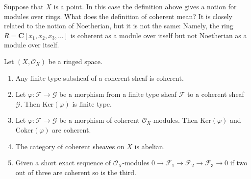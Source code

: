 \begin{example}
\label{example-coherent-not-Noetherian}
Suppose that $X$ is a point. In this case the definition
above gives a notion for modules over rings.
What does the definition of coherent mean?
It is closely related to the notion of Noetherian,
but it is not the same: Namely, the ring
$R = \mathbf{C}[x_1, x_2, x_3, \ldots]$ is coherent
as a module over itself but not Noetherian as a module
over itself.
\end{example}

\begin{lemma}
\label{lemma-coherent-abelian}
Let $(X, \mathcal{O}_X)$ be a ringed space.
\begin{enumerate}
\item Any finite type subsheaf of a coherent sheaf is coherent.
\item Let $\varphi : \mathcal{F} \to \mathcal{G}$
be a morphism from a finite type sheaf $\mathcal{F}$
to a coherent sheaf $\mathcal{G}$. Then $\text{Ker}(\varphi)$ is finite type.
\item Let $\varphi : \mathcal{F} \to \mathcal{G}$ be a morphism
of coherent $\mathcal{O}_X$-modules. Then
$\text{Ker}(\varphi)$ and
$\text{Coker}(\varphi)$ are coherent.
\item The category of coherent sheaves on $X$ is abelian.
\item Given a short exact sequence of $\mathcal{O}_X$-modules
$0 \to \mathcal{F}_1 \to \mathcal{F}_2 \to \mathcal{F}_3 \to 0$
if two out of three are coherent so is the third.
\end{enumerate}
\end{lemma}

